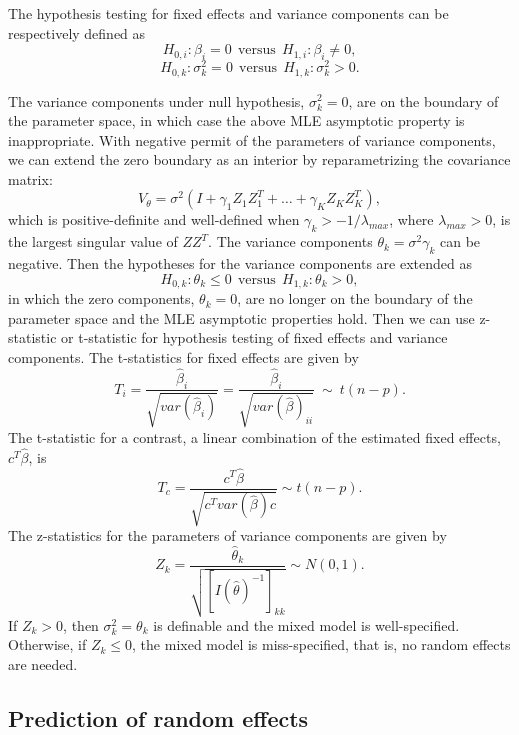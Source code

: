\documentclass[
]{article}
\begin{document}
The hypothesis testing for fixed effects and variance components can be
respectively defined as \[
H_{0, i}: \beta_i = 0 ~~\text{versus}~~H_{1,i}: \beta_i\ne 0,
\] \[
H_{0, k}: \sigma^2_k = 0 ~~\text{versus}~~H_{1,k}: \sigma^2_k > 0.
\]

The variance components under null hypothesis, \(\sigma^2_k=0\), are on
the boundary of the parameter space, in which case the above MLE
asymptotic property is inappropriate. With negative permit of the
parameters of variance components, we can extend the zero boundary as an
interior by reparametrizing the covariance matrix: \[
V_{\theta} = \sigma^2(I + \gamma_1Z_1Z_1^T + \ldots + \gamma_KZ_KZ_K^T),
\] which is positive-definite and well-defined when
\(\gamma_k > - 1/\lambda_{max}\), where \(\lambda_{max} > 0\), is the
largest singular value of \(ZZ^T\). The variance components
\(\theta_k = \sigma^2\gamma_k\) can be negative. Then the hypotheses for
the variance components are extended as \[
H_{0, k}: \theta_k \le 0 ~~\text{versus}~~H_{1,k}: \theta_k > 0,
\] in which the zero components, \(\theta_k=0\), are no longer on the
boundary of the parameter space and the MLE asymptotic properties hold.
Then we can use z-statistic or t-statistic for hypothesis testing of
fixed effects and variance components. The t-statistics for fixed
effects are given by \begin{equation}\label{tcoef}
T_i = \frac{\hat\beta_i}{\sqrt{var(\hat\beta_i)}} = \frac{\hat\beta_i}{\sqrt{var(\hat\beta)_{ii}}} ~\sim ~t(n - p).
\end{equation} The t-statistic for a contrast, a linear combination of
the estimated fixed effects, \(c^T\hat\beta\), is
\begin{equation}\label{tcontrast}
T_c = \frac{c^T\hat\beta}{\sqrt{c^Tvar(\hat\beta) c}} \sim t(n-p).
\end{equation} The z-statistics for the parameters of variance
components are given by \begin{equation}\label{zvarcomp}
Z_k = \frac{\hat\theta_k}{\sqrt{[I(\hat\theta)^{-1}]_{kk}}} \sim N(0, 1).
\end{equation} If \(Z_k > 0\), then \(\sigma_k^2 = \theta_k\) is
definable and the mixed model is well-specified. Otherwise, if
\(Z_k \le 0\), the mixed model is miss-specified, that is, no random
effects are needed.

\hypertarget{prediction-of-random-effects}{%
\subsection{Prediction of random
effects}\label{prediction-of-random-effects}}
\end{document}
